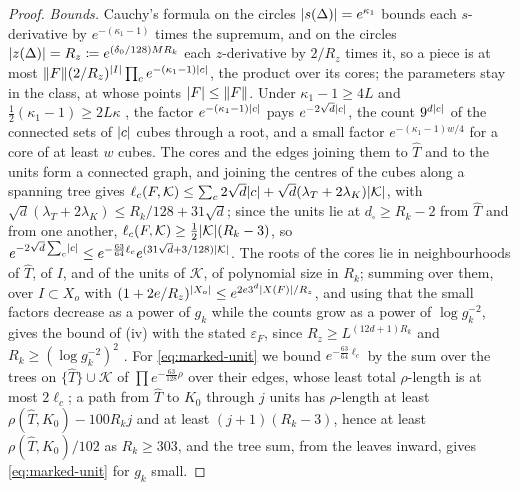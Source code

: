 \documentclass[11pt]{preprint}
\DeclarePairedDelimiter{\abs}{\lvert}{\rvert}
\DeclarePairedDelimiter{\norm}{\lVert}{\rVert}
\numberwithin{equation}{section}
\theoremstyle{definition}
\theoremstyle{remark}
\theoremstyle{plain}
\begin{document}
\begin{proof}
\emph{Bounds.} Cauchy's formula on the circles $\abs{s(\Delta)} = e^{\kappa_1}$ bounds each $s$-derivative by $e^{-(\kappa_1-1)}$ times the supremum, and on the circles $\abs{z(\Delta)} = R_z \coloneqq e^{(\delta_0/128)MR_k}$ each $z$-derivative by $2/R_z$ times it, so a piece is at most $\norm F(2/R_z)^{\abs I}\prod_ce^{-(\kappa_1-1)\abs c}$, the product over its cores; the parameters stay in the class, at whose points $\abs F \leq \norm F$. Under $\kappa_1 - 1 \geq 4L$ and $\frac12(\kappa_1 - 1) \geq 2L\kappa$ \cite[p.~20, l.~17]{BalabanRG2}, the factor $e^{-(\kappa_1-1)\abs c}$ pays $e^{-2\sqrt d\abs c}$, the count $9^{d\abs c}$ of the connected sets of $\abs c$ cubes through a root, and a small factor $e^{-(\kappa_1-1)w/4}$ for a core of at least $w$ cubes. The cores and the edges joining them to $\hat T$ and to the units form a connected graph, and joining the centres of the cubes along a spanning tree gives $\ell_c(F, \mathcal K) \leq \sum_c2\sqrt d\abs c + \sqrt d(\lambda_T + 2\lambda_K)\abs{\mathcal K}$, with $\sqrt d(\lambda_T + 2\lambda_K) \leq R_k/128 + 31\sqrt d$; since the units lie at $d_\square \geq R_k - 2$ from $\hat T$ and from one another, $\ell_c(F, \mathcal K) \geq \frac12\abs{\mathcal K}(R_k - 3)$, so $e^{-2\sqrt d\sum_c\abs c} \leq e^{-\frac{63}{64}\ell_c}e^{(31\sqrt d + 3/128)\abs{\mathcal K}}$. The roots of the cores lie in neighbourhoods of $\hat T$, of $I$, and of the units of $\mathcal K$, of polynomial size in $R_k$; summing over them, over $I \subset X_o$ with $(1 + 2e/R_z)^{\abs{X_o}} \leq e^{2e3^d\abs{X(F)}/R_z}$, and using that the small factors decrease as a power of $g_k$ while the counts grow as a power of $\log g_k^{-2}$, gives the bound of (iv) with the stated $\varepsilon_F$, since $R_z \geq L^{(12d+1)R_k}$ and $R_k \geq (\log g_k^{-2})^2$ \cite[(2.5), p.~255]{BalabanCRE}. For \eqref{eq:marked-unit} we bound $e^{-\frac{63}{64}\ell_c}$ by the sum over the trees on $\{\hat T\} \cup \mathcal K$ of $\prod e^{-\frac{63}{128}\rho}$ over their edges, whose least total $\rho$-length is at most $2\ell_c$; a path from $\hat T$ to $K_0$ through $j$ units has $\rho$-length at least $\rho(\hat T, K_0) - 100R_kj$ and at least $(j + 1)(R_k - 3)$, hence at least $\rho(\hat T, K_0)/102$ as $R_k \geq 303$, and the tree sum, from the leaves inward, gives \eqref{eq:marked-unit} for $g_k$ small.


\end{proof}
\end{document}
